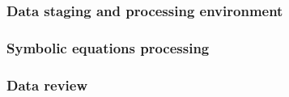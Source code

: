 \subsubsection{Data staging and processing environment}

\subsubsection{Symbolic equations processing}

\subsubsection{Data review}
